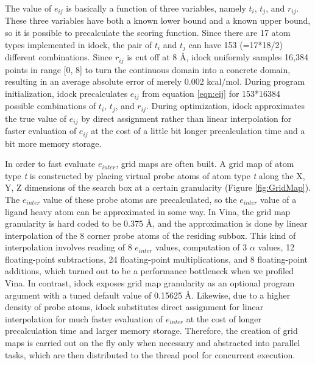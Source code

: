 \documentclass[10pt, conference, compsocconf]{../IEEEtran}
\begin{document}
The value of $e_{ij}$ is basically a function of three variables, namely $t_i$, $t_j$, and $r_{ij}$. These three variables have both a known lower bound and a known upper bound, so it is possible to precalculate the scoring function. Since there are 17 atom types implemented in idock, the pair of $t_i$ and $t_j$ can have 153 (=17*18/2) different combinations. Since $r_{ij}$ is cut off at 8 \AA, idock uniformly samples 16,384 points in range [0, 8] to turn the continuous domain into a concrete domain, resulting in an average absolute error of merely 0.002 kcal/mol. During program initialization, idock precalculates $e_{ij}$ from equation \eqref{eqn:eij} for 153*16384 possible combinations of $t_i$, $t_j$, and $r_{ij}$. During optimization, idock approximates the true value of $e_{ij}$ by direct assignment rather than linear interpolation for faster evaluation of $e_{ij}$ at the cost of a little bit longer precalculation time and a bit more memory storage.

In order to fast evaluate $e_{inter}$, grid maps are often built. A grid map of atom type \textit{t} is constructed by placing virtual probe atoms of atom type \textit{t} along the X, Y, Z dimensions of the search box at a certain granularity (Figure \ref{fig:GridMap}). The $e_{inter}$ value of these probe atoms are precalculated, so the $e_{inter}$ value of a ligand heavy atom can be approximated in some way. In Vina, the grid map granularity is hard coded to be 0.375 \AA, and the approximation is done by linear interpolation of the 8 corner probe atoms of the residing subbox. This kind of interpolation involves reading of 8 $e_{inter}$ values, computation of 3 $\alpha$ values, 12 floating-point subtractions, 24 floating-point multiplications, and 8 floating-point additions, which turned out to be a performance bottleneck when we profiled Vina. In contrast, idock exposes grid map granularity as an optional program argument with a tuned default value of 0.15625 \AA. Likewise, due to a higher density of probe atoms, idock substitutes direct assignment for linear interpolation for much faster evaluation of $e_{inter}$ at the cost of longer precalculation time and larger memory storage. Therefore, the creation of grid maps is carried out on the fly only when necessary and abstracted into parallel tasks, which are then distributed to the thread pool for concurrent execution.

\end{document}
